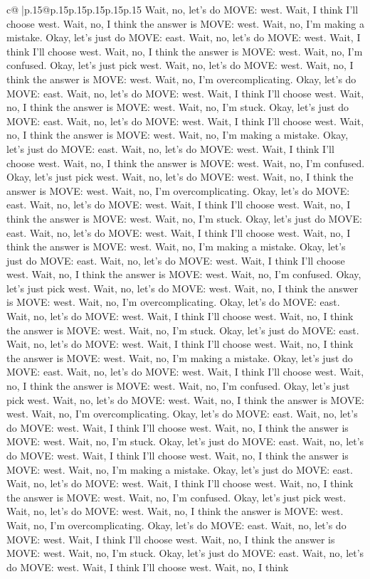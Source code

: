 \documentclass{article}
\begin{document}
{\begin{supertabular}{c@{$\;$}|p{.15\linewidth}@{}p{.15\linewidth}p{.15\linewidth}p{.15\linewidth}p{.15\linewidth}p{.15\linewidth}}
{{{Wait, no, let's do MOVE: west. Wait, I think I'll choose west. Wait, no, I think the answer is MOVE: west. Wait, no, I'm making a mistake. Okay, let's just do MOVE: east. Wait, no, let's do MOVE: west. Wait, I think I'll choose west. Wait, no, I think the answer is MOVE: west. Wait, no, I'm confused. Okay, let's just pick west. Wait, no, let's do MOVE: west. Wait, no, I think the answer is MOVE: west. Wait, no, I'm overcomplicating. Okay, let's do MOVE: east. Wait, no, let's do MOVE: west. Wait, I think I'll choose west. Wait, no, I think the answer is MOVE: west. Wait, no, I'm stuck. Okay, let's just do MOVE: east. Wait, no, let's do MOVE: west. Wait, I think I'll choose west. Wait, no, I think the answer is MOVE: west. Wait, no, I'm making a mistake. Okay, let's just do MOVE: east. Wait, no, let's do MOVE: west. Wait, I think I'll choose west. Wait, no, I think the answer is MOVE: west. Wait, no, I'm confused. Okay, let's just pick west. Wait, no, let's do MOVE: west. Wait, no, I think the answer is MOVE: west. Wait, no, I'm overcomplicating. Okay, let's do MOVE: east. Wait, no, let's do MOVE: west. Wait, I think I'll choose west. Wait, no, I think the answer is MOVE: west. Wait, no, I'm stuck. Okay, let's just do MOVE: east. Wait, no, let's do MOVE: west. Wait, I think I'll choose west. Wait, no, I think the answer is MOVE: west. Wait, no, I'm making a mistake. Okay, let's just do MOVE: east. Wait, no, let's do MOVE: west. Wait, I think I'll choose west. Wait, no, I think the answer is MOVE: west. Wait, no, I'm confused. Okay, let's just pick west. Wait, no, let's do MOVE: west. Wait, no, I think the answer is MOVE: west. Wait, no, I'm overcomplicating. Okay, let's do MOVE: east. Wait, no, let's do MOVE: west. Wait, I think I'll choose west. Wait, no, I think the answer is MOVE: west. Wait, no, I'm stuck. Okay, let's just do MOVE: east. Wait, no, let's do MOVE: west. Wait, I think I'll choose west. Wait, no, I think the answer is MOVE: west. Wait, no, I'm making a mistake. Okay, let's just do MOVE: east. Wait, no, let's do MOVE: west. Wait, I think I'll choose west. Wait, no, I think the answer is MOVE: west. Wait, no, I'm confused. Okay, let's just pick west. Wait, no, let's do MOVE: west. Wait, no, I think the answer is MOVE: west. Wait, no, I'm overcomplicating. Okay, let's do MOVE: east. Wait, no, let's do MOVE: west. Wait, I think I'll choose west. Wait, no, I think the answer is MOVE: west. Wait, no, I'm stuck. Okay, let's just do MOVE: east. Wait, no, let's do MOVE: west. Wait, I think I'll choose west. Wait, no, I think the answer is MOVE: west. Wait, no, I'm making a mistake. Okay, let's just do MOVE: east. Wait, no, let's do MOVE: west. Wait, I think I'll choose west. Wait, no, I think the answer is MOVE: west. Wait, no, I'm confused. Okay, let's just pick west. Wait, no, let's do MOVE: west. Wait, no, I think the answer is MOVE: west. Wait, no, I'm overcomplicating. Okay, let's do MOVE: east. Wait, no, let's do MOVE: west. Wait, I think I'll choose west. Wait, no, I think the answer is MOVE: west. Wait, no, I'm stuck. Okay, let's just do MOVE: east. Wait, no, let's do MOVE: west. Wait, I think I'll choose west. Wait, no, I think }}}
\end{supertabular}}
\end{document}
